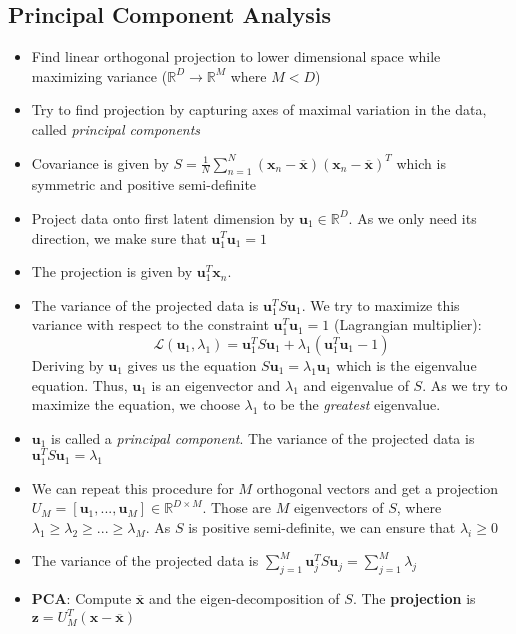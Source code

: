 \subsection{Principal Component Analysis}
\begin{itemize}
	\item Find linear orthogonal projection to lower dimensional space while maximizing variance ($\mathbb{R}^{D}\to \mathbb{R}^{M}$ where $M<D$)
	\item Try to find projection by capturing axes of maximal variation in the data, called \textit{principal components}
	\item Covariance is given by $S=\frac{1}{N}\sum\limits_{n=1}^{N}\left(\bm{x}_n - \overline{\bm{x}}\right)\left(\bm{x}_n - \overline{\bm{x}}\right)^T$  which is symmetric and positive semi-definite
	\item Project data onto first latent dimension by $\bm{u}_1 \in \mathbb{R}^D$. As we only need its direction, we make sure that $\bm{u}_1^T \bm{u}_1 = 1$
	\item The projection is given by $\bm{u}_1^T \bm{x}_n$.
	\item The variance of the projected data is $\bm{u}_1^T S \bm{u}_1$. We try to maximize this variance with respect to the constraint $\bm{u}_1^T \bm{u}_1 = 1$ (Lagrangian multiplier):
	$$\mathcal{L}(\bm{u}_1, \lambda_1) = \bm{u}_1^T S \bm{u}_1 + \lambda_1 (\bm{u}_1^T \bm{u}_1 - 1)$$
	Deriving by $\bm{u}_1$ gives us the equation $S\bm{u}_1 = \lambda_1 \bm{u}_1$ which is the eigenvalue equation. Thus, $\bm{u}_1$ is an eigenvector and $\lambda_1$ and eigenvalue of $S$. As we try to maximize the equation, we choose $\lambda_1$ to be the \textit{greatest} eigenvalue.
	\item $\bm{u}_1$ is called a \textit{principal component}. The variance of the projected data is $\bm{u}_1^T S \bm{u}_1 = \lambda_1$
	\item We can repeat this procedure for $M$ orthogonal vectors and get a projection $U_M = \left[\bm{u}_1, ..., \bm{u}_M\right] \in \mathbb{R}^{D\times M}$. Those are $M$ eigenvectors of $S$, where $\lambda_1 \geq \lambda_2 \geq ... \geq \lambda_M$. As $S$ is positive semi-definite, we can ensure that $\lambda_i\geq 0$
	\item The variance of the projected data is $\sum\limits_{j=1}^{M} \bm{u}_j^T S \bm{u}_j = \sum\limits_{j=1}^{M} \lambda_j$
	\item \textbf{PCA}: Compute $\overline{\bm{x}}$ and the eigen-decomposition of $S$. The \textbf{projection} is $\bm{z} = U_M^T \left(\bm{x} - \overline{\bm{x}}\right)$

\end{itemize}
